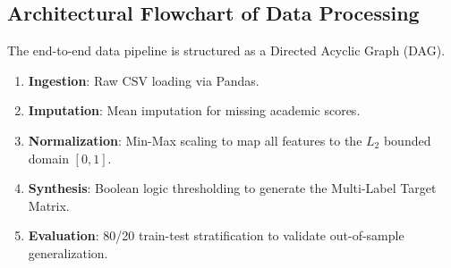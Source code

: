 \subsection{Architectural Flowchart of Data Processing}
The end-to-end data pipeline is structured as a Directed Acyclic Graph (DAG). 
\begin{enumerate}
    \item \textbf{Ingestion}: Raw CSV loading via Pandas.
    \item \textbf{Imputation}: Mean imputation for missing academic scores.
    \item \textbf{Normalization}: Min-Max scaling to map all features to the $L_2$ bounded domain $[0, 1]$.
    \item \textbf{Synthesis}: Boolean logic thresholding to generate the Multi-Label \parencite{tsoumakas2007multi} Target Matrix.
    \item \textbf{Evaluation}: 80/20 train-test stratification to validate out-of-sample generalization.
\end{enumerate}


